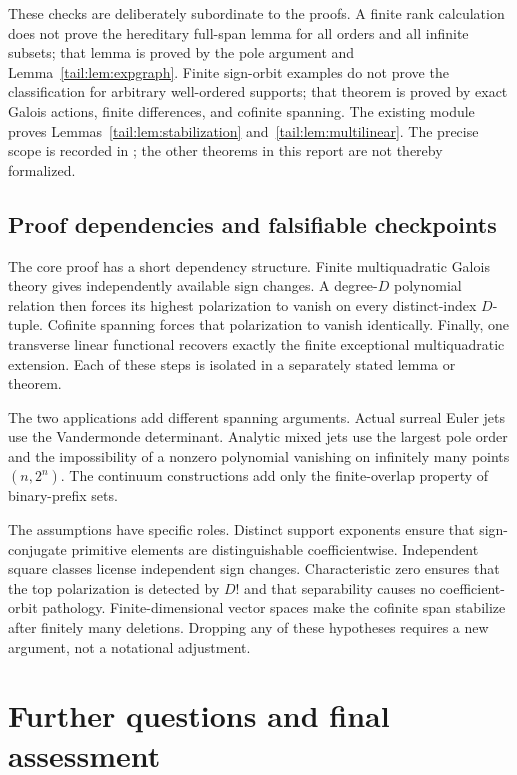 \documentclass[11pt,a4paper]{article}
\numberwithin{equation}{section}
\theoremstyle{definition}
\theoremstyle{remark}
\begin{document}
These checks are deliberately subordinate to the proofs. A finite rank
calculation does not prove the hereditary full-span lemma for all orders
and all infinite subsets; that lemma is proved by the pole argument and
Lemma~\ref{tail:lem:expgraph}. Finite sign-orbit examples do not prove the
classification for arbitrary well-ordered supports; that theorem is
proved by exact Galois actions, finite differences, and cofinite spanning.
The existing module  proves
Lemmas~\ref{tail:lem:stabilization} and~\ref{tail:lem:multilinear}.
The precise scope is recorded in ; the other
theorems in this report are not thereby formalized.

\subsection{Proof dependencies and falsifiable checkpoints}
The core proof has a short dependency structure. Finite multiquadratic
Galois theory gives independently available sign changes. A degree-$D$
polynomial relation then forces its highest polarization to vanish on
every distinct-index $D$-tuple. Cofinite spanning forces that polarization
to vanish identically. Finally, one transverse linear functional recovers
exactly the finite exceptional multiquadratic extension. Each of these
steps is isolated in a separately stated lemma or theorem.

The two applications add different spanning arguments. Actual surreal
Euler jets use the Vandermonde determinant. Analytic mixed jets use the
largest pole order and the impossibility of a nonzero polynomial vanishing
on infinitely many points $(n,2^n)$. The continuum constructions add only
the finite-overlap property of binary-prefix sets.

The assumptions have specific roles. Distinct support exponents ensure
that sign-conjugate primitive elements are distinguishable coefficientwise.
Independent square classes license independent sign changes. Characteristic
zero ensures that the top polarization is detected by $D!$ and that
separability causes no coefficient-orbit pathology. Finite-dimensional
vector spaces make the cofinite span stabilize after finitely many
deletions. Dropping any of these hypotheses requires a new argument,
not a notational adjustment.

\section{Further questions and final assessment}\label{tail:sec:questions}
\end{document}
